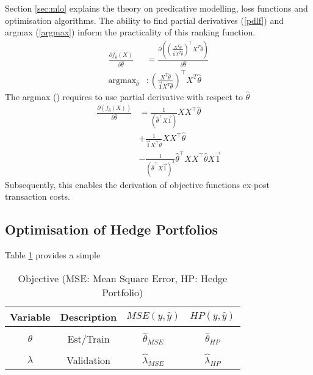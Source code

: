 \documentclass[10pt]{article}
\DeclareMathOperator*{\argmax}{argmax} %
\begin{document}
Section \ref{sec:mlo} explains the theory on predicative modelling, loss functions and optimisation algorithms.
The ability to find partial derivatives (\ref{pdlf}) and argmax (\ref{argmax}) inform the practicality of this ranking function.
\begin{align}
	\frac{\partial f_{\hat{\theta}}(X)}{\partial \hat{\theta}} &= \frac{\partial ((\frac{X^{T} \hat{\theta}}{\vec{\textbf{1}}X^{T} \hat{\theta}})^\top X^{T} \hat{\theta})}{\partial \hat{\theta}} \label{pdlf}\\
	\argmax_{\hat{\theta}} &: (\frac{X^{T} \hat{\theta}}{\vec{\textbf{1}}X^{T} \hat{\theta}})^\top X^{T} \hat{\theta} \label{argmax}
\end{align}
The argmax (\label{argmax}) requires to use partial derivative with respect to $\hat{\theta}$
\begin{align}
	\frac{\partial (f_{\hat{\theta}}(X))}{\partial \hat{\theta}}  &= \frac{1}{(\hat{\theta}^\top X \vec{1})} X X^\top \hat{\theta}\\
	&+\frac{1}{\vec{1}X^\top \hat{\theta}} XX^\top \hat{\theta}\\
	&-\frac{1}{(\hat{\theta}^\top X \vec{1})^{2}} \hat{\theta}^\top XX^\top \hat{\theta} X \vec{1}
\end{align}
Subsequently, this enables the derivation of objective functions ex-post transaction costs.
\subsection{Optimisation of Hedge Portfolios}
Table \ref{hpt} provides a simple 
	\begin{table}[H]
		\centering
		\begin{tabular}{||c|c|c|c||}
			\hline
			Variable & Description & $ MSE(y,\hat{y}) $ & $ HP(y,\hat{y}) $\\ [0.5ex]
			\hline
			&&&\\
			$\theta$ & Est/Train& $ \hat{\theta}_{MSE}$& $ \hat{\theta}_{HP}$ \\ [0.5ex]
			\hline
			&&&\\
			$\lambda$ & Validation & $\hat{\lambda}_{MSE}$ & $\hat{\lambda}_{HP}$\\ [1.0ex]
			\hline
		\end{tabular}
	\caption{Objective (MSE: Mean Square Error, HP: Hedge Portfolio)}
	\label{hpt}
\end{table}
\newpage
\end{document}
